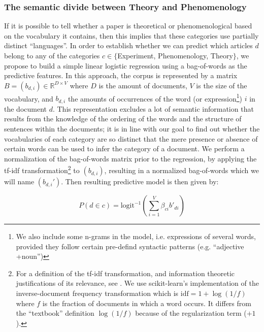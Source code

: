 \documentclass[smallextended]{svjour3}
\begin{document}
\subsubsection{The semantic divide between Theory and Phenomenology}

If it is possible to tell whether a paper is theoretical or phenomenological based on the vocabulary it contains, then this implies that these categories use partially distinct ``languages''. In order to establish whether we can predict which articles $d$ belong to any of the categories $c \in \{$Experiment, Phenomenology, Theory$\}$, we propose to build a simple linear logistic regression using a bag-of-words as the predictive features. In this approach, the corpus is represented by a matrix $B=(b_{d,i}) \in \mathbb{R}^{D\times V}$ where $D$ is the amount of documents, $V$ is the size of the vocabulary, and $b_{d,i}$ the amounts of occurrences of the word (or expression\footnote{We also include some n-grams in the model, i.e. expressions of several words, provided they follow certain pre-defind syntactic patterns (e.g. ``adjective +noun'')}) $i$ in the document $d$. This representation excludes a lot of semantic information that results from the knowledge of the ordering of the words and the structure of sentences within the documents; it is in line with our goal to find out whether the vocabularies of each category are so distinct that the mere presence or absence of certain words can be used to infer the category of a document. We perform a normalization of the bag-of-words matrix prior to the regression, by applying the tf-idf transformation\footnote{For a definition of the tf-idf transformation, and information theoretic justifications of its relevance, see \citealt{Beel2015_tfidf_uses,Robertson2004_tfidf_justification}. We use scikit-learn's implementation of the inverse-document frequency transformation which is $\text{idf} = 1+\log(1/f)$ where $f$ is the fraction of documents in which a word occurs. It differs from the ``textbook'' definition $\log(1/f)$ because of the regularization term ($+1$).} to $(b_{d,i})$, resulting in a normalized bag-of-words which we will name $(b_{d,i}')$. Then resulting predictive model is then given by:

\begin{equation}
    \label{eq:logistic_bow_classifier}
    P(d\in c) = \mathrm{logit}^{-1}\left(\sum_{i=1}^V \beta_{ci} b'_{di}  \right)
\end{equation}
\end{document}
